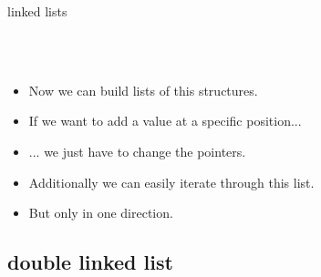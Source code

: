 \documentclass[10pt,graphics,aspectratio=169,table]{beamer}
\begin{document}
\begin{frame}{linked lists}
\begin{tikzpicture}[scale=.73,font=\scriptsize]
		
	\end{tikzpicture}
	\ \\\ \\
	\begin{itemize}[<+->]
		\item Now we can build lists of this structures.
		\item If we want to add a value at a specific position...
		\item ... we just have to change the pointers.
	\end{itemize}
	
	\begin{itemize}
		\item<6-> Additionally we can easily iterate through this list.
		\item<6-> But only in one direction.
	\end{itemize}
	
\end{frame}

\subsection{double linked list}
\end{document}
